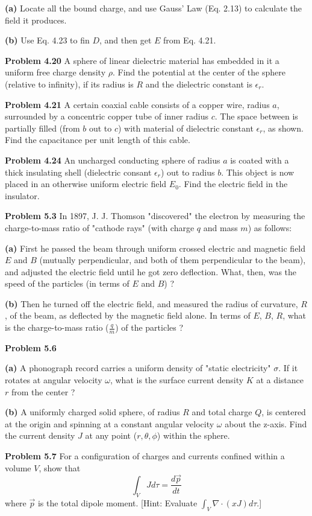 \documentclass{article}
\begin{document}
\textbf{(a)}
Locate all the bound charge, and use Gauss' Law (Eq. 2.13) to calculate the field it produces.

\textbf{(b)}
Use Eq. 4.23 to fin $D$, and then get $E$ from Eq. 4.21.

\textbf{Problem 4.20}
A sphere of linear dielectric material has embedded in it a uniform free charge density $\rho$.
Find the potential at the center of the sphere (relative to infinity), if its radius is $R$ and the dielectric constant is $\epsilon_r$.

\textbf{Problem 4.21}
A certain coaxial cable consists of a copper wire, radius $a$, surrounded by a concentric copper tube of inner radius $c$.
The space between is partially filled (from $b$ out to $c$) with material of dielectric constant $\epsilon_r$, as shown.
Find the capacitance per unit length of this cable.

\textbf{Problem 4.24}
An uncharged conducting sphere of radius $a$ is coated with a thick insulating shell (dielectric consant $\epsilon_r$) out to radius $b$.
This object is now placed in an otherwise uniform electric field $E_0$.
Find the electric field in the insulator.

\textbf{Problem 5.3}
In 1897, J. J. Thomson "discovered" the electron by measuring the charge-to-mass ratio of "cathode rays" (with charge $q$ and mass $m$) as follows:

\textbf{(a)}
First he passed the beam through uniform crossed electric and magnetic field $E$ and $B$ (mutually perpendicular, and both of them perpendicular to the beam), and adjusted the electric field until he got zero deflection.
What, then, was the speed of the particles (in terms of $E$ and $B$) ?

\textbf{(b)}
Then he turned off the electric field, and measured the radius of curvature, $R$, of the beam, as deflected by the magnetic field alone.
In terms of $E$, $B$, $R$, what is the charge-to-mass ratio ($\frac{q}{m}$) of the particles ?

\textbf{Problem 5.6}

\textbf{(a)}
A phonograph record carries a uniform density of "static electricity" $\sigma$.
If it rotates at angular velocity $\omega$, what is the surface current density $K$ at a distance $r$ from the center ?

\textbf{(b)}
A uniformly charged solid sphere, of radius $R$ and total charge $Q$, is centered at the origin and spinning at a constant angular velocity $\omega$ about the z-axis.
Find the current density $J$ at any point ($r, \theta, \phi$) within the sphere.

\textbf{Problem 5.7}
For a configuration of charges and currents confined within a volume $V$, show that
$$ \int_V J d\tau = \frac{d\vec{p}}{dt} $$
where $\vec{p}$ is the total dipole moment.
[Hint: Evaluate $\int_V \nabla \cdot (xJ) d\tau$.]
\end{document}
